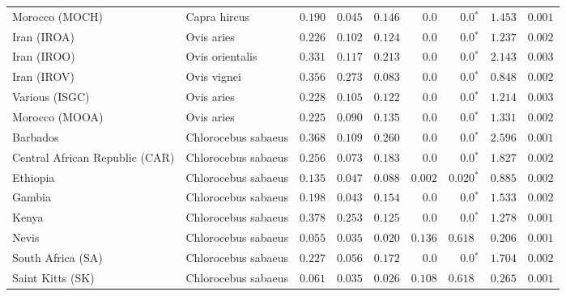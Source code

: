 \begin{center}
\begin{adjustbox}{width = 1\textwidth}
\begin{tabular}{|l|l|r|r|r|r|r|r|r|}
            Morocco (MOCH)                    & Capra hircus     & $ 0.190$ & $ 0.045$ & $ 0.146$ & $0.0$    & $\bm{0.0{^*}}$    & $ 1.453$ & $ 0.001$ \\
            Iran (IROA)                    & Ovis aries         & $ 0.226$ & $ 0.102$ & $ 0.124$ & $0.0$    & $\bm{0.0{^*}}$    & $ 1.237$ & $ 0.002$ \\
            Iran (IROO)                 & Ovis orientalis          & $ 0.331$ & $ 0.117$ & $ 0.213$ & $0.0$    & $\bm{0.0{^*}}$    & $ 2.143$ & $ 0.003$ \\
            Iran (IROV)                 & Ovis vignei          & $ 0.356$ & $ 0.273$ & $ 0.083$ & $0.0$    & $\bm{0.0{^*}}$    & $ 0.848$ & $ 0.002$ \\
            Various (ISGC)                       & Ovis aries & $ 0.228$ & $ 0.105$ & $ 0.122$ & $0.0$    & $\bm{0.0{^*}}$    & $ 1.214$ & $ 0.003$ \\
            Morocco (MOOA) & Ovis aries & $ 0.225$ & $ 0.090$ & $ 0.135$ & $0.0$ & $\bm{0.0{^*}}$ & $ 1.331$ & $ 0.002$ \\
            Barbados                       & Chlorocebus sabaeus & $ 0.368$ & $ 0.109$ & $ 0.260$ & $0.0$ & $\bm{0.0{^*}}$ & $ 2.596$ & $ 0.001$ \\
            Central African Republic (CAR)                         & Chlorocebus sabaeus & $ 0.256$ & $ 0.073$ & $ 0.183$ & $0.0$    & $\bm{0.0{^*}}$    & $ 1.827$ & $ 0.002$ \\
            Ethiopia                          & Chlorocebus sabaeus & $ 0.135$ & $ 0.047$ & $ 0.088$ & $ 0.002$    & $\bm{ 0.020{^*}}$    & $ 0.885$ & $ 0.002$ \\
            Gambia                          & Chlorocebus sabaeus & $ 0.198$ & $ 0.043$ & $ 0.154$ & $0.0$ & $\bm{0.0{^*}}$        & $ 1.533$ & $ 0.002$ \\
            Kenya              & Chlorocebus sabaeus & $ 0.378$ & $ 0.253$ & $ 0.125$ & $0.0$    & $\bm{0.0{^*}}$ & $ 1.278$ & $ 0.001$ \\
            Nevis               & Chlorocebus sabaeus & $ 0.055$ & $ 0.035$ & $ 0.020$ & $ 0.136$ & $ 0.618~~$ & $ 0.206$ & $ 0.001$ \\
            South Africa (SA)                         & Chlorocebus sabaeus & $ 0.227$ & $ 0.056$ & $ 0.172$ & $0.0$ & $\bm{0.0{^*}}$        & $ 1.704$ & $ 0.002$ \\
            Saint Kitts (SK)                  & Chlorocebus sabaeus        & $ 0.061$ & $ 0.035$ & $ 0.026$ & $ 0.108$ & $ 0.618~~$        & $ 0.265$ & $ 0.001$ \\

\end{tabular}
\end{adjustbox}
\end{center}
